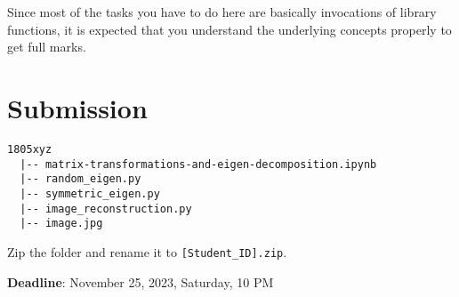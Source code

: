 \documentclass[11pt, a4paper]{article}
\begin{document}
Since most of the tasks you have to do here are basically invocations of library functions, it is expected that you understand the underlying concepts properly to get full marks.

\section{Submission}
\begin{verbatim}
1805xyz
  |-- matrix-transformations-and-eigen-decomposition.ipynb
  |-- random_eigen.py
  |-- symmetric_eigen.py
  |-- image_reconstruction.py
  |-- image.jpg
\end{verbatim}
Zip the folder and rename it to \texttt{[Student\_ID].zip}.

\textbf{Deadline}: November 25, 2023, Saturday, 10 PM
\end{document}
